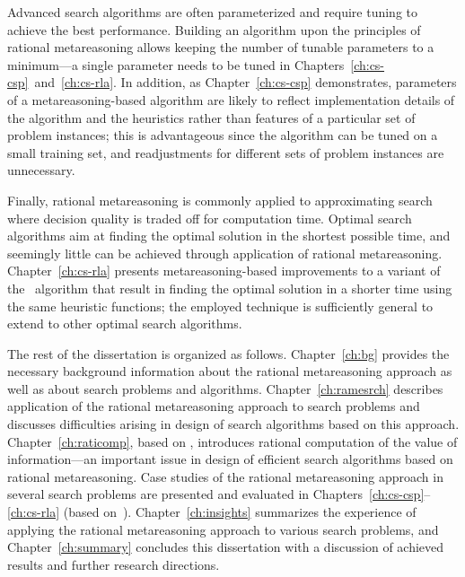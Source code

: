Advanced search algorithms are often parameterized and require tuning
to achieve the best performance. Building an algorithm upon the
principles of rational metareasoning allows keeping the number of
tunable parameters to a minimum---a single parameter needs to be tuned
in Chapters~\ref{ch:cs-csp}~and~\ref{ch:cs-rla}. In addition, as
Chapter~\ref{ch:cs-csp} demonstrates, parameters
of a metareasoning-based algorithm are likely to reflect
implementation details of the algorithm and the heuristics rather
than features of a particular set of problem instances; this is
advantageous since the algorithm can be tuned on a small training set,
and readjustments for different sets of problem instances are
unnecessary. 

Finally, rational metareasoning is commonly applied to approximating
search where decision quality is traded off for computation time. Optimal
search algorithms aim at finding the optimal solution in the shortest
possible time, and seemingly little can be achieved through
application of rational metareasoning.  Chapter~\ref{ch:cs-rla}
presents meta\-rea\-soning-based improvements to a variant of
the \astar~algorithm that result in finding the optimal solution in a
shorter time using the same heuristic functions; the employed
technique is sufficiently general to extend to other optimal
search algorithms.

The rest of the dissertation is organized as follows. Chapter~\ref{ch:bg}
provides the necessary background information about the rational
metareasoning approach as well as about search problems and
algorithms. Chapter~\ref{ch:ramesrch} describes application of the
rational metareasoning approach to search problems and discusses
difficulties arising in design of search algorithms based on this
approach. Chapter~\ref{ch:raticomp}, based
on \cite{TolpinShimony.raticomp}, introduces rational computation of
the value of information---an important issue in design of efficient
search algorithms based on rational metareasoning. Case studies of the
rational metareasoning approach in several search problems are
presented and evaluated in Chapters~\ref{ch:cs-csp}--\ref{ch:cs-rla} (based
on~\cite{TolpinShimony.csp,TolpinShimony.mcts,HayRussellTolpinShimony.selecting,TolpinEtAl.rla}).
Chapter~\ref{ch:insights} summarizes the experience of applying 
the rational metareasoning approach to various search problems, and
Chapter~\ref{ch:summary} concludes this dissertation with a discussion of
achieved results and further research directions.


